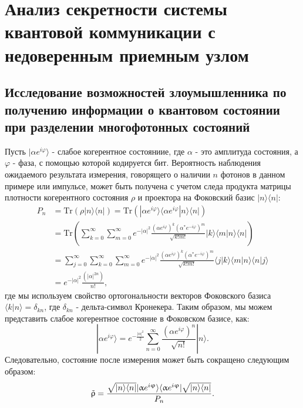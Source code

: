 \chapter{Анализ секретности системы квантовой коммуникации с недоверенным приемным узлом} \label{ch:ch6}
\section{Исследование возможностей злоумышленника по получению информации о квантовом состоянии при разделении многофотонных состояний} \label{sec:ch6/sec1}

Пусть $|\alpha e^{i \varphi}\rangle$ - слабое когерентное состояниие, где $\alpha$ - это амплитуда состояния, а $\varphi$ - фаза, с помощью которой кодируется бит. Вероятность наблюдения ожидаемого результата измерения, говорящего о наличии $n$ фотонов в данном примере или импульсе, может быть получена с учетом следа продукта матрицы плотности когерентного состояния $\rho$ и проектора на Фоковский базис $|n\rangle\langle n|$: 
%
\begin{align}
    P_n&=\text{Tr}(\rho |n\rangle\langle n|) = \text{Tr}(|\alpha e^{i \varphi}\rangle \langle\alpha e^{i \varphi} |n\rangle\langle n|) \nonumber \\
    &= \text{Tr}(\sum_{k=0}^{\infty}\sum_{m=0}^{\infty} e^{-|\alpha|^2} \frac{(\alpha e^{i \varphi})^k(\alpha^{*} e^{-i \varphi})^m}{\sqrt{k!m!}} |k\rangle\langle m |n\rangle\langle n|) \nonumber  \\
    &=\sum_{j=0}^{\infty}\sum_{k=0}^{\infty}\sum_{m=0}^{\infty} e^{-|\alpha|^2} \frac{(\alpha e^{i \varphi})^k(\alpha^{*} e^{-i \varphi})^m}{\sqrt{k!m!}}\langle j |k\rangle\langle m |n\rangle\langle n|j\rangle \nonumber  \\
    &=e^{-|\alpha|^2} \frac{(|\alpha|^{2n})}{n!}, \label{pnver}
\end{align}
% 
где мы используем свойство ортогональности векторов Фоковского базиса $\langle k| n \rangle = \delta_{kn}$, где $\delta_{kn}$ - дельта-символ Кронекера. Таким образом, мы можем представить слабое когерентное состояние в Фоковском базисе, как:
%
\begin{equation}
    |\alpha e^{i \varphi}\rangle = e^{-\frac{|\alpha|^2}{2}}\sum_{n=0}^{\infty}  \frac{(\alpha e^{i \varphi})^n}{\sqrt{n!}} |n\rangle.
\end{equation}
%
Следовательно, состояние после измерения может быть сокращено следующим образом:
%
\begin{equation}
    \Tilde{\rho}=\frac{\sqrt{|n\rangle\langle n|} |\alpha e^{i \varphi}\rangle \langle\alpha e^{i \varphi} | \sqrt{|n\rangle\langle n|}}{P_n}.
\end{equation}
